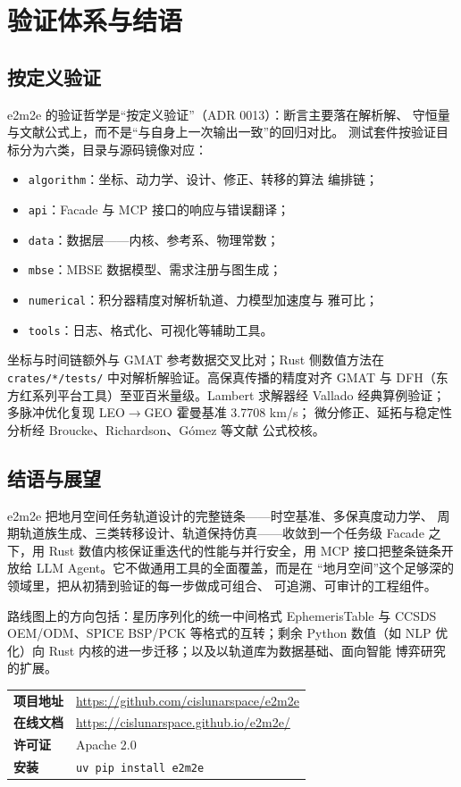 \section{验证体系与结语}
\label{sec:verification}

\subsection{按定义验证}

e2m2e 的验证哲学是“按定义验证”（ADR 0013）：断言主要落在解析解、
守恒量与文献公式上，而不是“与自身上一次输出一致”的回归对比。
测试套件按验证目标分为六类，目录与源码镜像对应：

\begin{itemize}
  \item \texttt{algorithm}：坐标、动力学、设计、修正、转移的算法
        编排链；
  \item \texttt{api}：Facade 与 MCP 接口的响应与错误翻译；
  \item \texttt{data}：数据层——内核、参考系、物理常数；
  \item \texttt{mbse}：MBSE 数据模型、需求注册与图生成；
  \item \texttt{numerical}：积分器精度对解析轨道、力模型加速度与
        雅可比；
  \item \texttt{tools}：日志、格式化、可视化等辅助工具。
\end{itemize}

坐标与时间链额外与 GMAT 参考数据交叉比对；Rust 侧数值方法在
\texttt{crates/*/tests/} 中对解析解验证。高保真传播的精度对齐 GMAT
与 DFH（东方红系列平台工具）至亚百米量级。Lambert 求解器经 Vallado
经典算例验证；多脉冲优化复现 LEO$\to$GEO 霍曼基准 3.7708 km/s；
微分修正、延拓与稳定性分析经 Broucke、Richardson、Gómez 等文献
公式校核。

\subsection{结语与展望}

e2m2e 把地月空间任务轨道设计的完整链条——时空基准、多保真度动力学、
周期轨道族生成、三类转移设计、轨道保持仿真——收敛到一个任务级
Facade 之下，用 Rust 数值内核保证重迭代的性能与并行安全，用 MCP
接口把整条链条开放给 LLM Agent。它不做通用工具的全面覆盖，而是在
“地月空间”这个足够深的领域里，把从初猜到验证的每一步做成可组合、
可追溯、可审计的工程组件。

路线图上的方向包括：星历序列化的统一中间格式 EphemerisTable 与
CCSDS OEM/ODM、SPICE BSP/PCK 等格式的互转；剩余 Python 数值（如 NLP
优化）向 Rust 内核的进一步迁移；以及以轨道库为数据基础、面向智能
博弈研究的扩展。

\begin{center}
\small
\begin{tabular}{@{}ll@{}}
\toprule
\textbf{项目地址} & \url{https://github.com/cislunarspace/e2m2e} \\
\textbf{在线文档} & \url{https://cislunarspace.github.io/e2m2e/} \\
\textbf{许可证} & Apache 2.0 \\
\textbf{安装} & \texttt{uv pip install e2m2e} \\
\bottomrule
\end{tabular}
\end{center}
